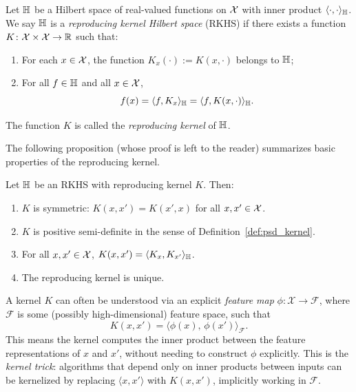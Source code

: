 \begin{definition}\label{def:rkhs}
Let $\mathbb{H}$ be a Hilbert space of real-valued functions on $\mathcal{X}$ with inner product
$\langle \cdot, \cdot \rangle_{\mathbb{H}}$.  We say $\mathbb{H}$ is a \emph{reproducing kernel Hilbert space}
(RKHS) if there exists a function $K\colon\mathcal{X}\times\mathcal{X}\to\mathbb{R}$ such that:
\begin{enumerate}
\item For each $x\in\mathcal{X}$, the function $K_x(\cdot) := K(x,\cdot)$ belongs to $\mathbb{H}$;
\item For all $f\in\mathbb{H}$ and all $x\in\mathcal{X}$,
\begin{equation}\label{eq:reproducing}
  f(x) = \langle f, K_x\rangle_{\mathbb{H}} = \langle f, K(x,\cdot)\rangle_{\mathbb{H}}.
\end{equation}
\end{enumerate}
The function $K$ is called the \emph{reproducing kernel} of $\mathbb{H}$.
\end{definition}

The following proposition (whose proof is left to the reader) summarizes basic properties of the reproducing kernel.

\begin{proposition}\label{prop:rk_properties}
Let $\mathbb{H}$ be an RKHS with reproducing kernel $K$.  Then:
\begin{enumerate}
\item $K$ is symmetric: $K(x,x') = K(x',x)$ for all $x,x'\in\mathcal{X}$.
\item $K$ is positive semi-definite in the sense of Definition~\ref{def:psd_kernel}.
\item For all $x,x'\in\mathcal{X}$, $K(x,x') = \langle K_x, K_{x'} \rangle_{\mathbb{H}}$.
\item The reproducing kernel is unique.
\end{enumerate}
\end{proposition}

A kernel $K$ can often be understood via an explicit {\em feature map} $\phi: \mathcal{X} \to \mathcal{F}$, where $\mathcal{F}$ is some (possibly high-dimensional) feature space, such that
\begin{equation}\label{eq:kerneltrick}
    K(x, x') = \langle \phi(x),\, \phi(x') \rangle_{\mathcal{F}}.
\end{equation}
This means the kernel computes the inner product between the feature representations of $x$ and $x'$, without needing to construct $\phi$ explicitly. This is the {\em kernel trick}: algorithms that depend only on inner products between inputs can be kernelized by replacing $\langle x, x' \rangle$ with $K(x, x')$, implicitly working in $\mathcal{F}$.

